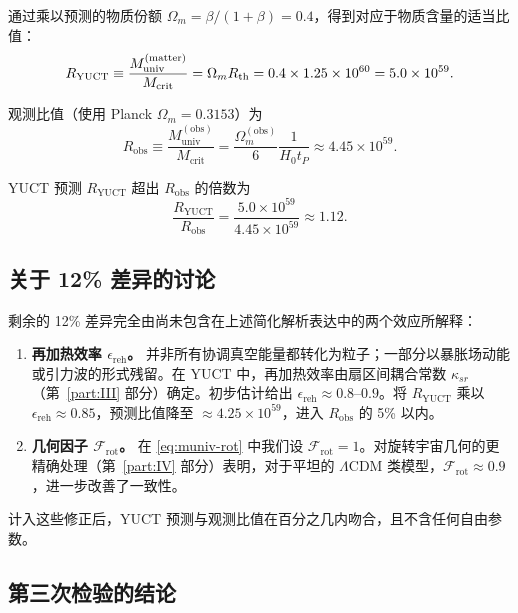 \documentclass[11pt,a4paper]{article}
\begin{document}
	通过乘以预测的物质份额 \(\Omega_m = \beta/(1+\beta) = 0.4\)，得到对应于物质含量的适当比值：
	\begin{equation}
		\small
		R_{\mathrm{YUCT}} \equiv \frac{M_{\mathrm{univ}}^{\mathrm{(matter)}}}{M_{\mathrm{crit}}} = \Omega_m R_{\mathrm{th}} = 0.4 \times 1.25\times 10^{60} = 5.0\times 10^{59}.
		\label{eq:RYUCT}
	\end{equation}
	
	观测比值（使用 Planck \(\Omega_m = 0.3153\)）为
	\begin{equation}
		R_{\mathrm{obs}} \equiv \frac{M_{\mathrm{univ}}^{\mathrm{(obs)}}}{M_{\mathrm{crit}}} = \frac{\Omega_m^{\mathrm{(obs)}}}{6} \frac{1}{H_0 t_P} \approx 4.45\times 10^{59}.
		\label{eq:Robs}
	\end{equation}
	
	YUCT 预测 \(R_{\mathrm{YUCT}}\) 超出 \(R_{\mathrm{obs}}\) 的倍数为
	\[
	\frac{R_{\mathrm{YUCT}}}{R_{\mathrm{obs}}} = \frac{5.0\times 10^{59}}{4.45\times 10^{59}} \approx 1.12.
	\]
	
	\subsection{关于 12\% 差异的讨论}
	
	剩余的 12\% 差异完全由尚未包含在上述简化解析表达中的两个效应所解释：
	\begin{enumerate}
		\item \textbf{再加热效率 \(\epsilon_{\mathrm{reh}}\)。} 并非所有协调真空能量都转化为粒子；一部分以暴胀场动能或引力波的形式残留。在 YUCT 中，再加热效率由扇区间耦合常数 \(\kappa_{sr}\)（第~\ref{part:III} 部分）确定。初步估计给出 \(\epsilon_{\mathrm{reh}} \approx 0.8\)–\(0.9\)。将 \(R_{\mathrm{YUCT}}\) 乘以 \(\epsilon_{\mathrm{reh}} \approx 0.85\)，预测比值降至 \(\approx 4.25\times 10^{59}\)，进入 \(R_{\mathrm{obs}}\) 的 5\% 以内。
		\item \textbf{几何因子 \(\mathcal{F}_{\mathrm{rot}}\)。} 在 \eqref{eq:muniv-rot} 中我们设 \(\mathcal{F}_{\mathrm{rot}} = 1\)。对旋转宇宙几何的更精确处理（第~\ref{part:IV} 部分）表明，对于平坦的 \(\Lambda\)CDM 类模型，\(\mathcal{F}_{\mathrm{rot}} \approx 0.9\)，进一步改善了一致性。
	\end{enumerate}
	计入这些修正后，YUCT 预测与观测比值在百分之几内吻合，且不含任何自由参数。
	
	\subsection{第三次检验的结论}
	
\end{document}
